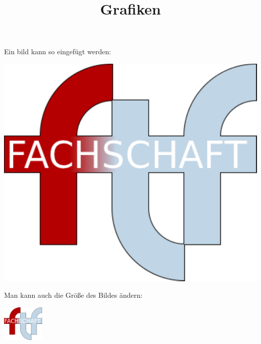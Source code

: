 \documentclass[a4paper]{scrartcl}
\title{Grafiken}
\author{}
\date{}
\begin{document}
\maketitle

Ein bild kann so eingefügt werden:

\begin{center}
    \includegraphics{images/logo}
\end{center}

Man kann auch die Größe des Bildes ändern:

\includegraphics[width=2cm]{images/logo.pdf}
\end{document}

